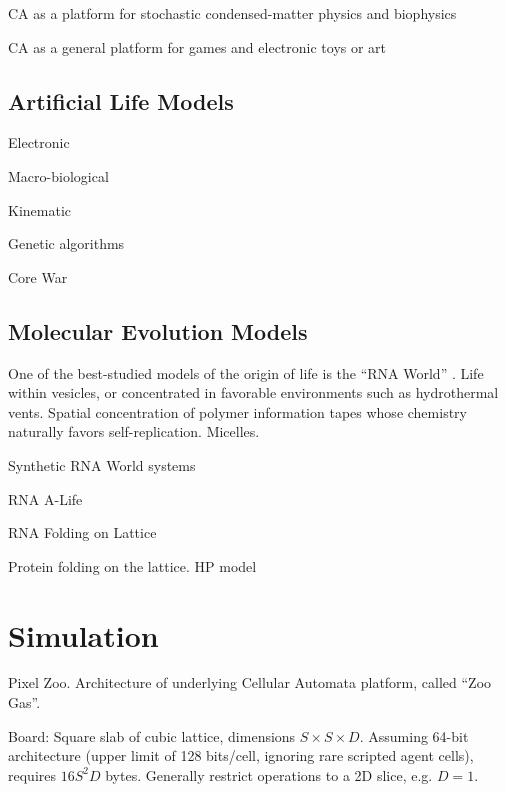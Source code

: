 \documentclass{acm_proc_article-sp}
\begin{document}
CA as a platform for stochastic condensed-matter physics and biophysics
\cite{Schiff2007}

CA as a general platform for games
\cite{SimCity,DwarfFortress,Minecraft}
and electronic toys or art \cite{RuckerCAPOW,PowderToy}

\subsection{Artificial Life Models}

Electronic
\cite{VonNeumannBook,Wireworld}

Macro-biological
\cite{ConwaysLife,Langton1986}

Kinematic
\cite{Stevens2011}

Genetic algorithms
\cite{Tierra,Avida}

Core War
\cite{CoreWarGuidelines84,CoreWarDewdney85,BarkleyWaitSchmidtCoreWar2004}

\subsection{Molecular Evolution Models}

One of the best-studied models of the origin of life is the ``RNA World''
\cite{Woese1967}.
Life within vesicles, or concentrated in favorable environments such as hydrothermal vents.  %
Spatial concentration of polymer information tapes whose chemistry naturally favors self-replication.
Micelles.

Synthetic RNA World systems
\cite{PaulJoyce2002}

RNA A-Life
\cite{journals/alife/Schuster94}

RNA Folding on Lattice
\cite{LeoniVanderzande2003,JostEveraers2010,ZaraPretti2007,GillespieMayneJiang2009}

Protein folding on the lattice. HP model \cite{Dill1985,PandeRokhsar1999}

\section{Simulation}

Pixel Zoo.
Architecture of underlying Cellular Automata platform, called ``Zoo Gas''.

Board:
Square slab of cubic lattice, dimensions $S \times S \times D$.
Assuming 64-bit architecture (upper limit of 128 bits/cell, ignoring rare scripted agent cells), requires $16S^2 D$ bytes.
Generally restrict operations to a 2D slice, e.g. $D=1$.
\end{document}

